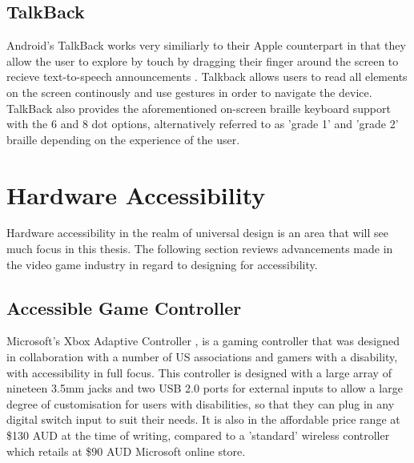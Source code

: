 
\subsection{TalkBack}
Android's TalkBack works very similiarly to their Apple counterpart in that they allow the user to explore by touch by dragging their finger around the screen to recieve text-to-speech announcements \cite{android}.
Talkback allows users to read all elements on the screen continously and use gestures in order to navigate the device. %
TalkBack also provides the aforementioned on-screen braille keyboard support with the 6 and 8 dot options, alternatively referred to as 'grade 1' and 'grade 2' braille depending on the experience of the user.


\section{Hardware Accessibility}

Hardware accessibility in the realm of universal design is an area that will see much focus in this thesis. %
The following section reviews advancements made in the video game industry in regard to designing for accessibility.


\subsection{Accessible Game Controller}

Microsoft's Xbox Adaptive Controller \cite{adaptive}, is a gaming controller that was designed in collaboration with a number of US associations and gamers with a disability, with accessibility in full focus.
This controller is designed with a large array of nineteen 3.5mm jacks and two USB 2.0 ports for external inputs \cite{adaptive} to allow a large degree of customisation for users with disabilities, so that they can plug in any digital switch input to suit their needs.
It is also in the affordable price range at \$130 AUD \cite{accessiblecontroller} at the time of writing, compared to a 'standard' wireless controller which retails at \$90 AUD \cite{standardcontroller} Microsoft online store.

